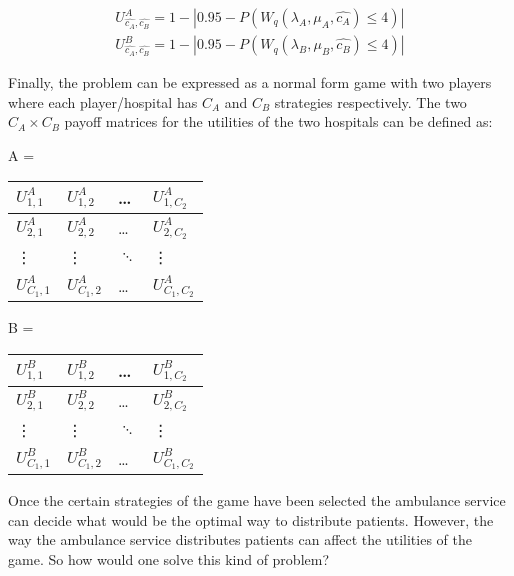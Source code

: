 \documentclass{article}
\begin{document}
\begin{align}\label{Utilities}
    U_{\hat{c_A}, \hat{c_B}} ^ {A} = 1 - |0.95 - P(W_q(\lambda_A, \mu_A, \hat{c_A}) \leq 4)| \\
    U_{\hat{c_A}, \hat{c_B}} ^ {B} = 1 - |0.95 - P(W_q(\lambda_B, \mu_B, \hat{c_B}) \leq 4)|
\end{align}

Finally, the problem can be expressed as a normal form game with two players where each player/hospital has $C_A$ and $C_B$ strategies respectively. The two $C_A \times C_B$ payoff matrices for the utilities of the two hospitals can be defined as:

\begin{table}[h]
    \centering
    \begin{minipage}{.5\linewidth}
        A = 
        \begin{tabular}{|l|l|l|l|}
            \hline
            $U_{1,1}^A$ & $U_{1,2}^A$ & \dots & $U_{1,C_2}^A$ \\ \hline
            $U_{2,1}^A$ & $U_{2,2}^A$ & \dots & $U_{2,C_2}^A$ \\ \hline
            \vdots & \vdots & $\ddots$ & \vdots \\ \hline
            $U_{C_1,1}^A$ & $U_{C_1,2}^A$ & \dots & $U_{C_1,C_2}^A$ \\ \hline
        \end{tabular}
    \end{minipage}%
    \begin{minipage}{.5\linewidth}
        B = 
        \begin{tabular}{|l|l|l|l|}
            \hline
            $U_{1,1}^B$ & $U_{1,2}^B$ & \dots & $U_{1,C_2}^B$ \\ \hline
            $U_{2,1}^B$ & $U_{2,2}^B$ & \dots & $U_{2,C_2}^B$ \\ \hline
            \vdots & \vdots & $\ddots$ & \vdots \\ \hline
            $U_{C_1,1}^B$ & $U_{C_1,2}^B$ & \dots & $U_{C_1,C_2}^B$ \\ \hline
        \end{tabular}
    \end{minipage}
\end{table}  
Once the certain strategies of the game have been selected the ambulance service can decide what would be the optimal way to distribute patients. However, the way the ambulance service distributes patients can affect the utilities of the game. So how would one solve this kind of problem?
 
\end{document}
